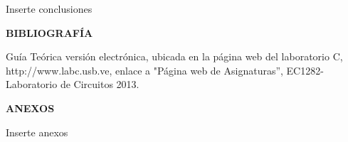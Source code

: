 \documentclass[12pt]{article}
\begin{document}
	Inserte conclusiones
	
	\newpage
	
	\begin{center}
		\textbf{\large BIBLIOGRAFÍA}\\
	\end{center}
	
	\noindent Guía Teórica versión electrónica, ubicada en la página web del laboratorio C, http://www.labc.usb.ve,
	enlace a "Página web de Asignaturas”, EC1282- Laboratorio de Circuitos 2013.
	
	\newpage
	
	\begin{center}
		\textbf{\large ANEXOS}\\
	\end{center}
	
	Inserte anexos
	
\end{document}

